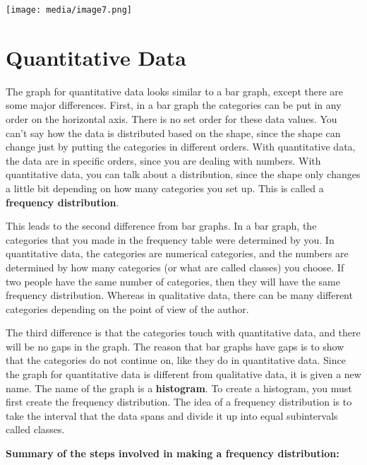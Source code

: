 \documentclass[]{book}
\begin{document}
\texttt{[image: media/image7.png]}

\hypertarget{quantitative-data}{%
\section{Quantitative Data}\label{quantitative-data}}

The graph for quantitative data looks similar to a bar graph, except there are some major differences. First, in a bar graph the categories can be put in any order on the horizontal axis. There is no set order for these data values. You can't say how the data is distributed based on the shape, since the shape can change just by putting the categories in different orders. With quantitative data, the data are in specific orders, since you are dealing with numbers. With quantitative data, you can talk about a distribution, since the shape only changes a little bit depending on how many categories you set up. This is called a \textbf{frequency distribution}.

This leads to the second difference from bar graphs. In a bar graph, the categories that you made in the frequency table were determined by you. In quantitative data, the categories are numerical categories, and the numbers are determined by how many categories (or what are called classes) you choose. If two people have the same number of categories, then they will have the same frequency distribution. Whereas in qualitative data, there can be many different categories depending on the point of view of the author.

The third difference is that the categories touch with quantitative data, and there will be no gaps in the graph. The reason that bar graphs have gaps is to show that the categories do not continue on, like they do in quantitative data. Since the graph for quantitative data is different from qualitative data, it is given a new name. The name of the graph is a \textbf{histogram}. To create a histogram, you must first create the frequency distribution. The idea of a frequency distribution is to take the interval that the data spans and divide it up into equal subintervals called classes.

\textbf{Summary of the steps involved in making a frequency distribution:}
\end{document}
